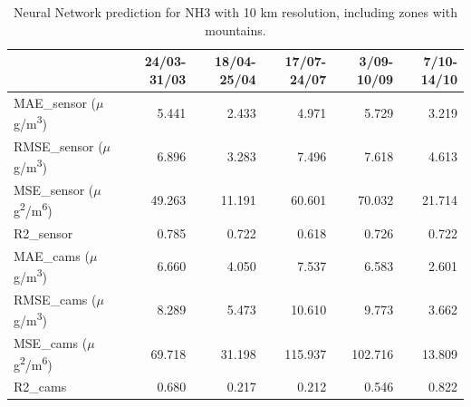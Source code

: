 \begin{table}[H]
\begin{tabular}{lrrrrr}
\toprule
 &  24/03-31/03 &  18/04-25/04 &  17/07-24/07 &  3/09-10/09 &  7/10-14/10 \\
\midrule
 MAE\_sensor ($\mu$g/m\textsuperscript{3})&        5.441 &        2.433 &        4.971 &       5.729 &       3.219 \\
RMSE\_sensor ($\mu$g/m\textsuperscript{3})&        6.896 &        3.283 &        7.496 &       7.618 &       4.613 \\
 MSE\_sensor ($\mu$g\textsuperscript{2}/m\textsuperscript{6})&       49.263 &       11.191 &       60.601 &      70.032 &      21.714 \\
  R2\_sensor &        0.785 &        0.722 &        0.618 &       0.726 &       0.722 \\
   MAE\_cams ($\mu$g/m\textsuperscript{3})&        6.660 &        4.050 &        7.537 &       6.583 &       2.601 \\
  RMSE\_cams ($\mu$g/m\textsuperscript{3})&        8.289 &        5.473 &       10.610 &       9.773 &       3.662 \\
   MSE\_cams ($\mu$g\textsuperscript{2}/m\textsuperscript{6})&       69.718 &       31.198 &      115.937 &     102.716 &      13.809 \\
    R2\_cams &        0.680 &        0.217 &        0.212 &       0.546 &       0.822 \\
\bottomrule
\end{tabular}
\caption{Neural Network prediction for NH3 with 10 km resolution, including zones with mountains.}
\end{table}
